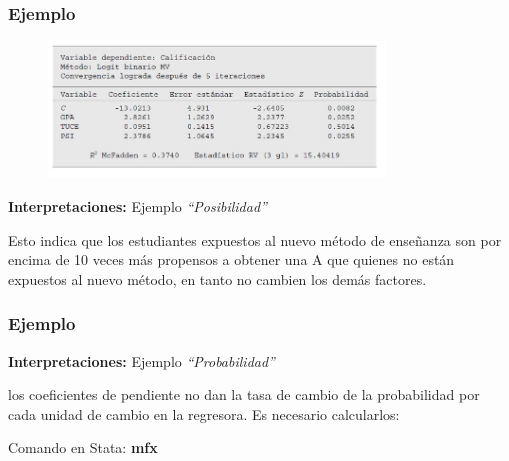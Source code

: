 \documentclass[10pt]{beamer}
\begin{document}



\begin{frame}
\frametitle{Ejemplo}

\begin{figure}
\begin{center}
    \includegraphics[width=0.8\textwidth]{9_6.JPG}
\end{center}
\end{figure}


\textbf{Interpretaciones:} Ejemplo \textit{``Posibilidad''}

\vspace{3mm}

Esto indica que los estudiantes expuestos al nuevo método de enseñanza son por encima de 10 veces más propensos a obtener una A que quienes no están expuestos al nuevo método, en tanto no cambien los demás factores.

\end{frame}






\begin{frame}
\frametitle{Ejemplo}

\textbf{Interpretaciones:} Ejemplo \textit{``Probabilidad''}

\vspace{3mm}
los coeficientes de pendiente no dan la tasa de cambio de la probabilidad por cada unidad de cambio en la regresora. Es necesario calcularlos: 

\vspace{3mm}

Comando en Stata: \textbf{mfx}

\end{frame}
\end{document}
